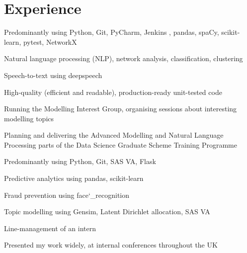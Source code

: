 \documentclass[]{cv-template}
\begin{document}
\hfill
\begin{minipage}[t]{0.66\textwidth} 


\section{Experience}
\vspace{\topsep} %
\begin{tightemize}
\item Predominantly using Python, Git, PyCharm, Jenkins , pandas, spaCy, scikit-learn, pytest, NetworkX
\item Natural language processing (NLP), network analysis, classification, clustering
\item Speech-to-text using deepspeech
\item High-quality (efficient and readable), production-ready unit-tested code
\item Running the Modelling Interest Group, organising sessions about interesting modelling topics
\item Planning and delivering the Advanced Modelling and Natural Language Processing parts of the Data Science Graduate Scheme Training Programme
\end{tightemize}

\sectionsep

\begin{tightemize}
\item Predominantly using Python, Git, SAS VA, Flask
\item Predictive analytics using pandas, scikit-learn
\item Fraud prevention using face\char`_recognition
\item Topic modelling using Gensim, Latent Dirichlet allocation, SAS VA
\item Line-management of an intern
\item Presented my work widely, at internal conferences throughout the UK
\end{tightemize}
\sectionsep


\end{minipage}
\end{document}

